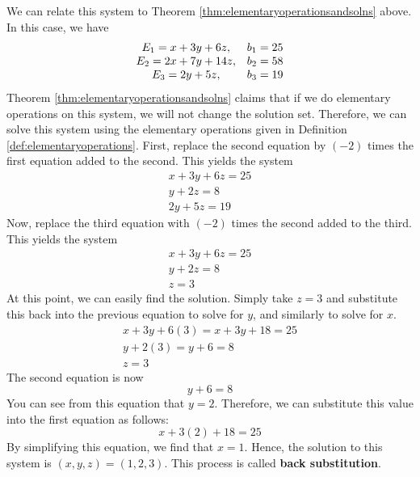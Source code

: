 \begin{solution}
We can relate this system to Theorem \ref{thm:elementaryoperationsandsolns} above. In this case, we have
\begin{equation*}
\begin{array}{c c}
E_{1} = x + 3y + 6z, & b_{1} = 25\\
E_{2} = 2x+7y+14z, & b_{2} = 58 \\
E_{3} = 2y+5z, & b_{3} = 19 
\end{array}
\end{equation*}
Theorem \ref{thm:elementaryoperationsandsolns} claims that if we do elementary operations on this system, 
we will not change the solution set. Therefore,
we can solve this system using the elementary operations given in Definition \ref{def:elementaryoperations}.
First, replace the second equation by $\left( -2\right)$
times the first equation added to the second. This yields the system
\begin{equation}
\begin{array}{c}
x+3y+6z=25 \\
y+2z=8 \\
2y+5z=19
\end{array}
\label{solvingasystem2}
\end{equation}
Now, replace the third equation with $\left( -2\right) $ times the
second added to the third. This yields the system
\begin{equation}
\begin{array}{c}
x+3y+6z=25 \\
y+2z=8 \\
z=3
\end{array}
\label{solvingasystem3}
\end{equation}
At this point, we can easily find the solution. Simply take $z=3$ and substitute this back into the
 previous equation to solve for $y$, and similarly to solve for $x$.
\begin{equation*}
\begin{array}{c}
x + 3y + 6 \left(3 \right) = x + 3y + 18 = 25\\
y + 2 \left(3 \right) = y + 6 = 8 \\
z = 3
\end{array}
\end{equation*}
The second equation is now
\begin{equation*}
y+6=8
\end{equation*}
You can see from this equation that $y = 2$. Therefore, we can substitute this value into the first equation as follows:
\begin{equation*}
x + 3 \left(2 \right) + 18 = 25
\end{equation*}
By simplifying this equation, we find that $x=1$. 
Hence, the solution to this system is $\left( x,y,z \right) = \left( 1,2,3 \right)$. 
This process is called \textbf{back substitution}. 


\end{solution}
